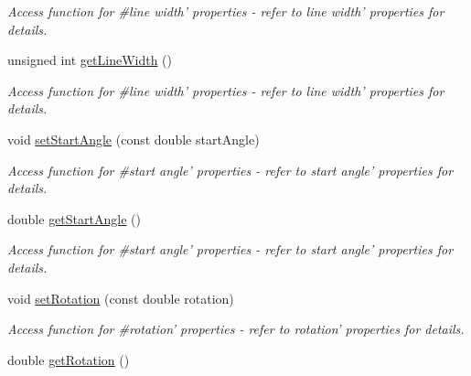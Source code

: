 \begin{DoxyCompactItemize}
\begin{DoxyCompactList}\small\item\em Access function for \#line width' properties -\/ refer to line width' properties for details. \end{DoxyCompactList}\item 
\hypertarget{classQEShape_a8efba239475a031fd77523368cbe50a7}{
unsigned int \hyperlink{classQEShape_a8efba239475a031fd77523368cbe50a7}{getLineWidth} ()}
\label{classQEShape_a8efba239475a031fd77523368cbe50a7}

\begin{DoxyCompactList}\small\item\em Access function for \#line width' properties -\/ refer to line width' properties for details. \end{DoxyCompactList}\item 
\hypertarget{classQEShape_abf21141cd37b9527e275f2e97f872737}{
void \hyperlink{classQEShape_abf21141cd37b9527e275f2e97f872737}{setStartAngle} (const double startAngle)}
\label{classQEShape_abf21141cd37b9527e275f2e97f872737}

\begin{DoxyCompactList}\small\item\em Access function for \#start angle' properties -\/ refer to start angle' properties for details. \end{DoxyCompactList}\item 
\hypertarget{classQEShape_ae8c1be286db75b914a634cb175239260}{
double \hyperlink{classQEShape_ae8c1be286db75b914a634cb175239260}{getStartAngle} ()}
\label{classQEShape_ae8c1be286db75b914a634cb175239260}

\begin{DoxyCompactList}\small\item\em Access function for \#start angle' properties -\/ refer to start angle' properties for details. \end{DoxyCompactList}\item 
\hypertarget{classQEShape_a582ae8317c541cc69216a6e8c9c88763}{
void \hyperlink{classQEShape_a582ae8317c541cc69216a6e8c9c88763}{setRotation} (const double rotation)}
\label{classQEShape_a582ae8317c541cc69216a6e8c9c88763}

\begin{DoxyCompactList}\small\item\em Access function for \#rotation' properties -\/ refer to rotation' properties for details. \end{DoxyCompactList}\item 
\hypertarget{classQEShape_a8499c0697b5de2ded177a90ec03da7e6}{
double \hyperlink{classQEShape_a8499c0697b5de2ded177a90ec03da7e6}{getRotation} ()}
\label{classQEShape_a8499c0697b5de2ded177a90ec03da7e6}


\end{DoxyCompactItemize}
